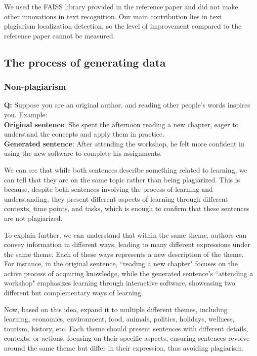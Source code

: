 We used the FAISS library provided in the reference paper and did not make other innovations in text recognition. Our main contribution lies in text plagiarism localization detection, so the level of improvement compared to the reference paper cannot be measured.

\subsection{The process of generating data}
\subsubsection{Non-plagiarism}
\textbf{Q:} Suppose you are an original author, and reading other people's words inspires you. Example:  \\
\textbf{Original sentence}: She spent the afternoon reading a new chapter, eager to understand the concepts and apply them in practice.  \\
\textbf{Generated sentence}: After attending the workshop, he felt more confident in using the new software to complete his assignments.  

We can see that while both sentences describe something related to learning, we can tell that they are on the same topic rather than being plagiarized. This is because, despite both sentences involving the process of learning and understanding, they present different aspects of learning through different contexts, time points, and tasks, which is enough to confirm that these sentences are not plagiarized.

To explain further, we can understand that within the same theme, authors can convey information in different ways, leading to many different expressions under the same theme. Each of these ways represents a new description of the theme. For instance, in the original sentence, ``reading a new chapter" focuses on the active process of acquiring knowledge, while the generated sentence's ``attending a workshop" emphasizes learning through interactive software, showcasing two different but complementary ways of learning.

Now, based on this idea, expand it to multiple different themes, including learning, economics, environment, food, animals, politics, holidays, wellness, tourism, history, etc. Each theme should present sentences with different details, contexts, or actions, focusing on their specific aspects, ensuring sentences revolve around the same theme but differ in their expression, thus avoiding plagiarism.\\

